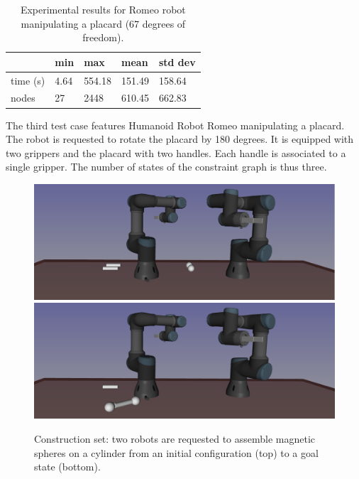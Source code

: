 \begin{table}
  \begin{center}
  \begin{tabular}{|l|l|l|l|l|}
    \hline
    & min & max & mean & std dev \\
    \hline
    time (s) & 4.64 & 554.18 & 151.49 & 158.64 \\
    nodes & 27 &  2448 & 610.45 & 662.83 \\
    \hline
  \end{tabular}
  \end{center}
  \caption{Experimental results for Romeo robot manipulating a placard
    {\color{blue}(67 degrees of freedom)}.}
  \label{tab:romeo-placard}
\end{table}

The third test case features Humanoid Robot Romeo manipulating a placard. The
robot is requested to rotate the placard by 180 degrees. It is equipped
with two grippers and the placard with two handles. Each handle is associated
to a single gripper. The number of states of the constraint graph is thus three.

\begin{figure}
  \begin{center}
    \includegraphics[width=\linewidth]{figures/construction-set-init.png}
    \includegraphics[width=\linewidth]{figures/construction-set-goal.png}    
  \end{center}
  \caption{Construction set: two robots are requested to assemble magnetic
    spheres on a cylinder from an initial configuration (top) to a goal state
    (bottom).}
  \label{fig:construction-set}
\end{figure}

